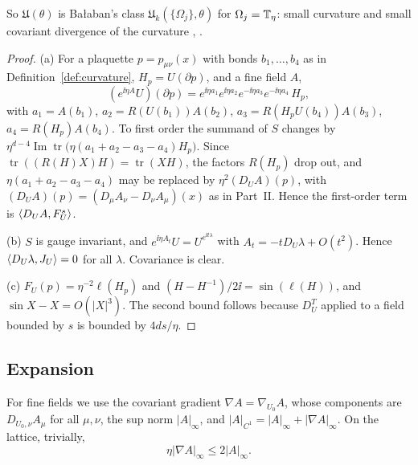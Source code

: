 So $\mathfrak U(\theta)$ is Ba\l aban's class $\mathfrak U_k(\{\Omega_j\},\theta)$ for $\Omega_j=\mathbb T_\eta$: small curvature and small covariant divergence of the curvature \cite[(1.7)--(1.9)]{BalReg}, \cite[(2)]{BalVar}.

\begin{proof}
(a) For a plaquette $p=p_{\mu\nu}(x)$ with bonds $b_1,\dots,b_4$ as in Definition~\ref{def:curvature}, $H_p=U(\partial p)$, and a fine field $A$,
\begin{equation}\label{eq:plaquette-product}
(e^{\ii\eta A}U)(\partial p)=e^{\ii\eta a_1}e^{\ii\eta a_2}e^{-\ii\eta a_3}e^{-\ii\eta a_4}\,H_p,
\end{equation}
with $a_1=A(b_1)$, $a_2=R(U(b_1))A(b_2)$, $a_3=R(H_pU(b_4))A(b_3)$, $a_4=R(H_p)A(b_4)$. To first order the summand of $S$ changes by $\eta^{d-4}\operatorname{Im}\operatorname{tr}\big(\eta(a_1+a_2-a_3-a_4)H_p\big)$. Since $\operatorname{tr}((R(H)X)H)=\operatorname{tr}(XH)$, the factors $R(H_p)$ drop out, and $\eta(a_1+a_2-a_3-a_4)$ may be replaced by $\eta^2(D_UA)(p)$, with $(D_UA)(p)=(D_\mu A_\nu-D_\nu A_\mu)(x)$ as in Part~II. Hence the first-order term is $\langle D_UA,F^s_U\rangle$.

(b) $S$ is gauge invariant, and $e^{\ii\eta A_t}U=U^{e^{\ii t\lambda}}$ with $A_t=-tD_U\lambda+O(t^2)$. Hence $\langle D_U\lambda,J_U\rangle=0$ for all $\lambda$. Covariance is clear.

(c) $F_U(p)=\eta^{-2}\ell(H_p)$ and $(H-H^{-1})/2\ii=\sin(\ell(H))$, and $\sin X-X=O(|X|^3)$. The second bound follows because $D^T_U$ applied to a field bounded by $s$ is bounded by $4ds/\eta$.
\end{proof}

\subsection{Expansion}

For fine fields we use the covariant gradient $\nabla A=\nabla_{U_0}A$, whose components are $D_{U_0,\nu}A_\mu$ for all $\mu,\nu$, the sup norm $|A|_\infty$, and $|A|_{C^1}=|A|_\infty+|\nabla A|_\infty$. On the lattice, trivially,
\begin{equation}\label{eq:lattice-trick}
\eta|\nabla A|_\infty\le2|A|_\infty .
\end{equation}

